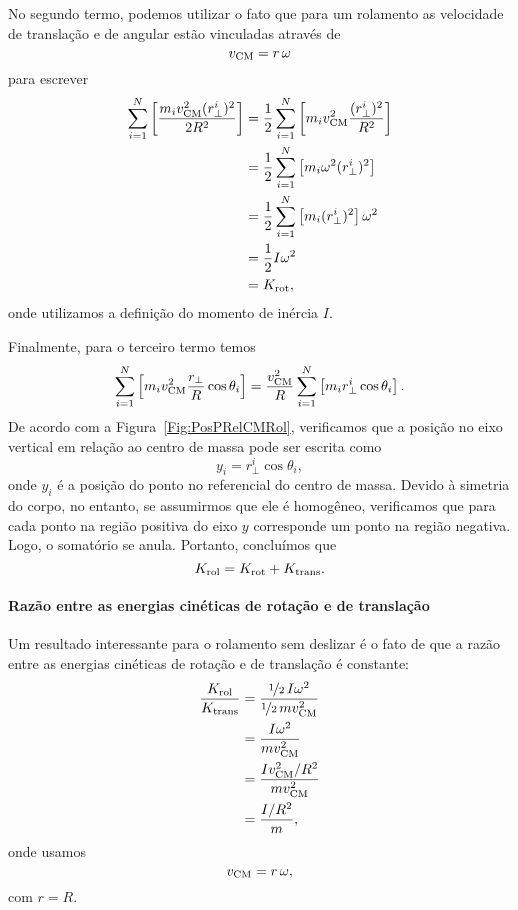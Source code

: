 No segundo termo, podemos utilizar o fato que para um rolamento as velocidade de translação e de angular estão vinculadas através de
\begin{equation}
    v_{\rm{CM}} = r\,\omega
\end{equation}
%
para escrever
\begin{align}
    \sum_{i=1}^N \left[\frac{m_i v_{\rm{CM}}^2 (r_\perp^i)^2}{2R^2} \right] &= \frac{1}{2} \sum_{i=1}^N \left[m_i v_{\rm{CM}}^2 \frac{(r_\perp^i)^2}{R^2} \right] \\
    &= \frac{1}{2} \sum_{i=1}^N \left[m_i \omega^2 (r_\perp^i)^2 \right] \\
    &= \frac{1}{2} \sum_{i=1}^N \left[m_i (r_\perp^i)^2 \right] \omega^2 \\
    &= \frac{1}{2} I \omega^2 \\
    &= K_{\rm{rot}},
\end{align}
%
onde utilizamos a definição do momento de inércia $I$.

Finalmente, para o terceiro termo temos
\begin{equation}
    \sum_{i=1}^N \left[m_i v_{\rm{CM}}^2 \frac{r_\perp}{R}\cos\theta_i\right] =  \frac{v_{\rm{CM}}^2}{R}\sum_{i=1}^N \left[m_i r_\perp^i \cos\theta_i\right].
\end{equation}
%
De acordo com a Figura~\ref{Fig:PosPRelCMRol}, verificamos que a posição no eixo vertical em relação ao centro de massa pode ser escrita como
\begin{equation}
    y_i = r_\perp^i \cos\theta_i,
\end{equation}
%
onde $y_i$ é a posição do ponto no referencial do centro de massa. Devido à simetria do corpo, no entanto, se assumirmos que ele é homogêneo, verificamos que para cada ponto na região positiva do eixo $y$ corresponde um ponto na região negativa. Logo, o somatório se anula. Portanto, concluímos que
\begin{equation}
    K_{\rm{rol}} = K_{\rm{rot}} + K_{\rm{trans}}.
\end{equation}

\paragraph{Razão entre as energias cinéticas de rotação e de translação}

Um resultado interessante para o rolamento sem deslizar é o fato de que a razão entre as energias cinéticas de rotação e de translação é constante:
\begin{align}
    \frac{K_{\rm{rol}}}{K_{\rm{trans}}} &= \frac{\nicefrac{1}{2} \, I \omega^2}{\nicefrac{1}{2} \, m v_{\rm{CM}}^2} \\
    &= \frac{I \omega^2}{m v_{\rm{CM}}^2} \\
    &= \frac{I v_{\rm{CM}}^2/R^2}{m v_{\rm{CM}}^2} \\
    &= \frac{I /R^2}{m},
\end{align}
%
onde usamos
\begin{equation}
    v_{\rm{CM}} = r\,\omega,
\end{equation}
%
com $r = R$.


